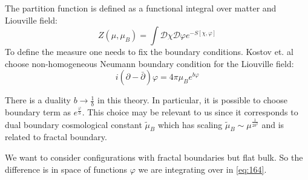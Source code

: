 \documentclass[12pt]{article}
\begin{document}
The partition function is defined as a functional integral over matter and Liouville field:
\begin{equation}
  \label{eq:164}
  Z(\mu,\mu_{B})=\int \mathcal{D}\chi \mathcal{D}\varphi e^{-S[\chi,\varphi]}
\end{equation}
To define the measure one needs to fix the boundary conditions. Kostov et. al choose non-homogeneous
Neumann boundary condition for the Liouville field:
\begin{equation}
  \label{eq:165}
  i(\partial -\bar\partial)\varphi=4\pi\mu_{B}e^{b\varphi}
\end{equation}

There is a duality $b\to \frac{1}{b}$ in this theory. In particular, it is possible to choose
boundary term as $e^{\frac{\varphi}{b}}$. This choice may be relevant to us since it corresponds to
dual boundary cosmological constant $\tilde\mu_{B}$ which has scaling $\tilde\mu_{B}\sim
\mu^{\frac{1}{2b^{2}}}$ and is related to fractal boundary. 

We want to consider configurations with fractal boundaries but flat bulk. So the difference is in
space of functions $\varphi$ we are integrating over in \eqref{eq:164}. 
\end{document}
